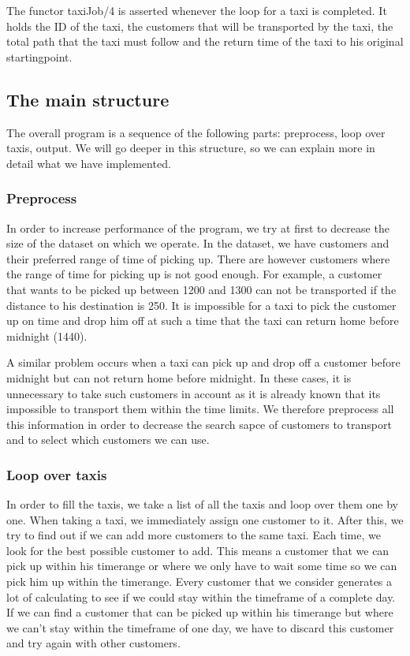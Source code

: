 \documentclass[10pt,a4paper]{article}
\begin{document}
The functor taxiJob/4 is asserted whenever the loop for a taxi is completed. It holds the ID of the taxi, the customers that will be transported by the taxi, the total path that the taxi must follow and the return time of the taxi to his original startingpoint.

\subsection{The main structure}

The overall program is a sequence of the following parts: preprocess, loop over taxis, output. We will go deeper in this structure, so we can explain more in detail what we have implemented.

\subsubsection{Preprocess}

In order to increase performance of the program, we try at first to decrease the size of the dataset on which we operate. In the dataset, we have customers and their preferred range of time of picking up. There are however customers where the range of time for picking up is not good enough. For example, a customer that wants to be picked up between 1200 and 1300 can not be transported if the distance to his destination is 250. It is impossible for a taxi to pick the customer up on time and drop him off at such a time that the taxi can return home before midnight (1440).

A similar problem occurs when a taxi can pick up and drop off a customer before midnight but can not return home before midnight. In these cases, it is unnecessary to take such customers in account as it is already known that its impossible to transport them within the time limits. We therefore preprocess all this information in order to decrease the search sapce of customers to transport and to select which customers we can use.

\subsubsection{Loop over taxis}

In order to fill the taxis, we take a list of all the taxis and loop over them one by one. When taking a taxi, we immediately assign one customer to it. After this, we try to find out if we can add more customers to the same taxi. Each time, we look for the best possible customer to add. This means a customer that we can pick up within his timerange or where we only have to wait some time so we can pick him up within the timerange. Every customer that we consider generates a lot of calculating to see if we could stay within the timeframe of a complete day. If we can find a customer that can be picked up within his timerange but where we can't stay within the timeframe of one day, we have to discard this customer and try again with other customers.
\end{document}

